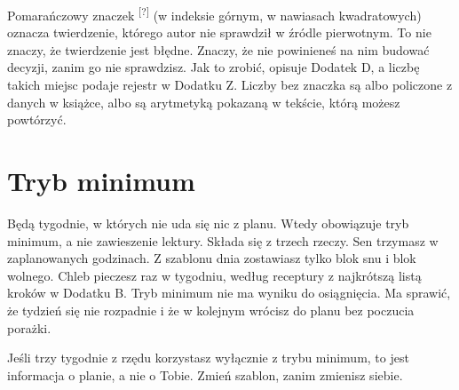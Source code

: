 Pomarańczowy znaczek \textsuperscript{\textcolor{accentorange}{[?]}} (w indeksie górnym, w nawiasach kwadratowych) oznacza twierdzenie, którego autor nie sprawdził w źródle pierwotnym. To nie znaczy, że twierdzenie jest błędne. Znaczy, że nie powinieneś na nim budować decyzji, zanim go nie sprawdzisz. Jak to zrobić, opisuje Dodatek D, a liczbę takich miejsc podaje rejestr w Dodatku Z. Liczby bez znaczka są albo policzone z danych w książce, albo są arytmetyką pokazaną w tekście, którą możesz powtórzyć.

\section*{Tryb minimum}

Będą tygodnie, w których nie uda się nic z planu. Wtedy obowiązuje tryb minimum, a nie zawieszenie lektury. Składa się z trzech rzeczy. Sen trzymasz w zaplanowanych godzinach. Z szablonu dnia zostawiasz tylko blok snu i blok wolnego. Chleb pieczesz raz w tygodniu, według receptury z najkrótszą listą kroków w Dodatku B. Tryb minimum nie ma wyniku do osiągnięcia. Ma sprawić, że tydzień się nie rozpadnie i że w kolejnym wrócisz do planu bez poczucia porażki.

Jeśli trzy tygodnie z rzędu korzystasz wyłącznie z trybu minimum, to jest informacja o planie, a nie o Tobie. Zmień szablon, zanim zmienisz siebie.
